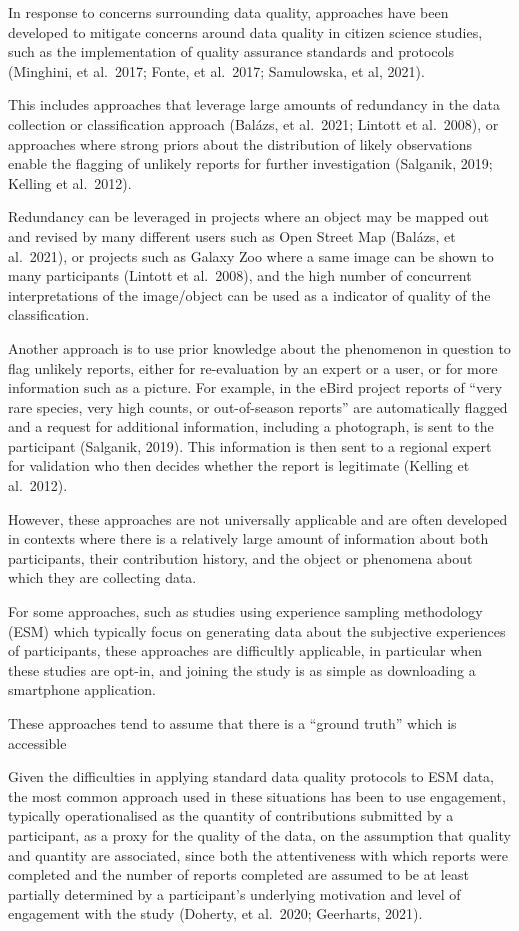 \documentclass[
]{article}
\begin{document}
In response to concerns surrounding data quality, approaches have been
developed to mitigate concerns around data quality in citizen science
studies, such as the implementation of quality assurance standards and
protocols (Minghini, et al.~2017; Fonte, et al.~2017; Samulowska, et al,
2021).

This includes approaches that leverage large amounts of redundancy in
the data collection or classification approach (Balázs, et al.~2021;
Lintott et al.~2008), or approaches where strong priors about the
distribution of likely observations enable the flagging of unlikely
reports for further investigation (Salganik, 2019; Kelling et al.~2012).

Redundancy can be leveraged in projects where an object may be mapped
out and revised by many different users such as Open Street Map (Balázs,
et al.~2021), or projects such as Galaxy Zoo where a same image can be
shown to many participants (Lintott et al.~2008), and the high number of
concurrent interpretations of the image/object can be used as a
indicator of quality of the classification.

Another approach is to use prior knowledge about the phenomenon in
question to flag unlikely reports, either for re-evaluation by an expert
or a user, or for more information such as a picture. For example, in
the eBird project reports of ``very rare species, very high counts, or
out-of-season reports'' are automatically flagged and a request for
additional information, including a photograph, is sent to the
participant (Salganik, 2019). This information is then sent to a
regional expert for validation who then decides whether the report is
legitimate (Kelling et al.~2012).

However, these approaches are not universally applicable and are often
developed in contexts where there is a relatively large amount of
information about both participants, their contribution history, and the
object or phenomena about which they are collecting data.

For some approaches, such as studies using experience sampling
methodology (ESM) which typically focus on generating data about the
subjective experiences of participants, these approaches are difficultly
applicable, in particular when these studies are opt-in, and joining the
study is as simple as downloading a smartphone application.

These approaches tend to assume that there is a ``ground truth'' which
is accessible

Given the difficulties in applying standard data quality protocols to
ESM data, the most common approach used in these situations has been to
use engagement, typically operationalised as the quantity of
contributions submitted by a participant, as a proxy for the quality of
the data, on the assumption that quality and quantity are associated,
since both the attentiveness with which reports were completed and the
number of reports completed are assumed to be at least partially
determined by a participant's underlying motivation and level of
engagement with the study (Doherty, et al.~2020; Geerharts, 2021).
\end{document}
